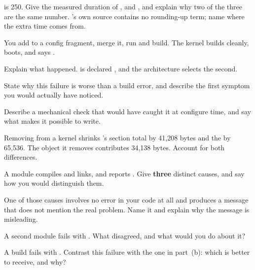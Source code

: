   is 250. Give the measured duration of ,  and
, and explain why two of the three are the same number. 's own source
contains no rounding-up term; name where the extra time comes from. 

\label{exb:q:3}

You add  to a config fragment, merge it, run  and
build. The kernel builds cleanly, boots, and  says .

 Explain what happened.  is declared , and the architecture selects the second. 

 State why this failure is worse than a build error, and describe the first symptom you
would actually have noticed. 

 Describe a mechanical check that would have caught it at configure time, and say what
makes it possible to write. 

 Removing  from a kernel shrinks 's section total by
41,208 bytes and the  by 65,536. The object it removes contributes 34,138 bytes. Account
for both differences. 

\label{exb:q:4}

 A module compiles and links, and  reports . Give \textbf{three} distinct causes, and say how you would distinguish them. 

 One of those causes involves no error in your code at all and produces a message that does
not mention the real problem. Name it and explain why the message is misleading. 

 A second module fails with . What disagreed, and what would
you do about it? 

 A build fails with . Contrast this failure with the one in part~(b): which is better to receive, and
why? 

